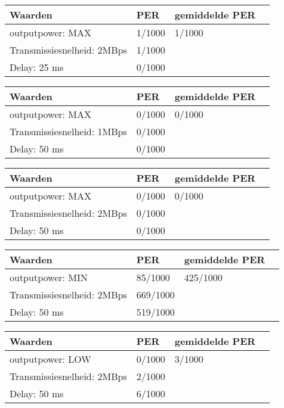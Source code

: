 \documentclass{article}
\begin{document}
    \begin{tabular}{ | l | l | l | p{5cm} |}
    \hline
    Waarden & PER & gemiddelde PER\\ \hline
    outputpower: MAX & 1/1000 & 1/1000\\ \hline
    Transmissiesnelheid: 2MBps & 1/1000 &  \\ \hline
    Delay: 25 ms & 0/1000&  \\
    \hline
    \end{tabular}
    
    
    \begin{tabular}{ | l | l | l | p{5cm} |}
    \hline
    Waarden & PER & gemiddelde PER\\ \hline
    outputpower: MAX & 0/1000 & 0/1000\\ \hline
    Transmissiesnelheid: 1MBps & 0/1000 &  \\ \hline
    Delay: 50 ms & 0/1000 &   \\
    \hline
    \end{tabular}
    
    
    \begin{tabular}{ | l | l | l | p{5cm} |}
    \hline
    Waarden & PER & gemiddelde PER\\ \hline
    outputpower: MAX & 0/1000 & 0/1000\\ \hline
    Transmissiesnelheid: 2MBps & 0/1000 &  \\ \hline
    Delay: 50 ms & 0/1000&  \\
    \hline
    \end{tabular}
    
    
    \begin{tabular}{ | l | l | l | p{5cm} |}
    \hline
    Waarden & PER & gemiddelde PER\\ \hline
    outputpower: MIN & 85/1000 & 425/1000\\ \hline
    Transmissiesnelheid: 2MBps & 669/1000  &  \\ \hline
    Delay: 50 ms & 519/1000 &  \\
    \hline
    \end{tabular}
    
    
    \begin{tabular}{ | l | l | l | p{5cm} |}
    \hline
    Waarden & PER & gemiddelde PER\\ \hline
    outputpower: LOW & 0/1000 & 3/1000\\ \hline
    Transmissiesnelheid: 2MBps & 2/1000 &   \\ \hline
    Delay: 50 ms & 6/1000 &  \\
    \hline
    \end{tabular}
    
\end{document}
